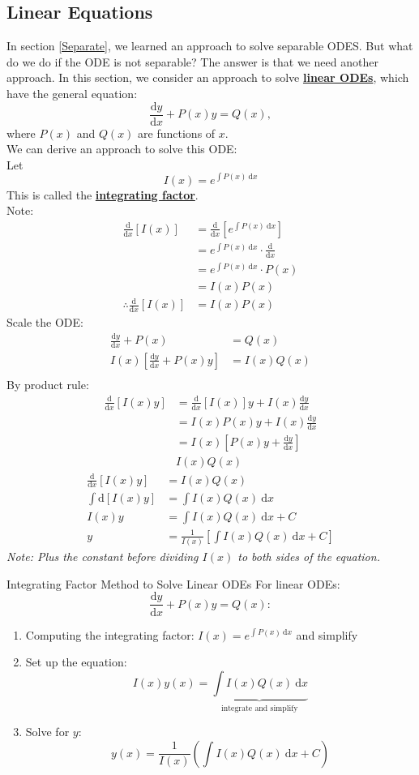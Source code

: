 \documentclass[12pt,a4paper]{article}
\def\d{{\mathrm{d}}}
\begin{document}
\subsection{Linear Equations}
In section \ref{Separate}, we learned an approach to solve separable ODES. But what do we do if the ODE is not separable? The answer is that we need another approach. In this section, we consider an approach to solve \underline{\textbf{linear ODEs}}, which have the general equation: $$\frac{\d y}{\d x}+P(x)y=Q(x),$$where $P(x)$ and $Q(x)$ are functions of $x$.\\
We can derive an approach to solve this ODE:\\
Let $$\displaystyle I(x)=e^{\int P(x)\ \d x}$$ This is called the \underline{\textbf{integrating factor}}.\\
Note: $$\begin{aligned}
	\frac{\d}{\d x}\left[I(x)\right]&=\frac{\d}{\d x}\left[e^{\int P(x)\ \d x}\right]	\\
	&=e^{\int P(x)\ \d x}\cdot\frac{\d}{\d x}\\
	&=e^{\int P(x)\ \d x}\cdot P(x)\\
	&=I(x)P(x)\\
\therefore\frac{\d}{\d x}[I(x)]&=I(x)P(x)
\end{aligned}$$
Scale the ODE: 
$$\begin{aligned}
	\frac{\d y}{\d x}+P(x)&=Q(x)\\
	\boxed{I(x)\left[\frac{\d y}{\d x}+P(x)y\right]}&=I(x)Q(x)\\
\end{aligned}$$
By product rule: 
$$\begin{aligned}
	\frac{\d}{\d x}[I(x)y]&=\frac{\d}{\d x}[I(x)]y+I(x)\frac{\d y}{\d x}\\
	&=I(x)P(x)y+I(x)\frac{\d y}{\d x}\\
	&=\boxed{I(x)\left[P(x)y+\frac{\d y}{\d x}\right]}\\
	&I(x)Q(x)
\end{aligned}$$
$$\begin{aligned}
	\frac{\d}{\d x}[I(x)y]&=I(x)Q(x)\\
	\int\d[I(x)y]&=\int I(x)Q(x)\ \d x\\
	I(x)y&=	\int I(x)Q(x)\ \d x + C\\
	y&=\frac{1}{I(x)}\left[\int I(x)Q(x)\ \d x + C\right]
\end{aligned}$$
\textit{Note: Plus the constant before dividing $I(x)$ to both sides of the equation. }
\begin{thm}{Integrating Factor Method to Solve Linear ODEs}
	For linear ODEs: 
	$$\frac{\d y}{\d x}+P(x)y=Q(x): $$
	\begin{enumerate}
		\item Computing the integrating factor: $I(x)=e^{\int P(x)\ \d x}$ and simplify
		\item Set up the equation: $$I(x)y(x)=\underbrace{\int I(x)Q(x)\ \d x}_{\text{integrate and simplify}}$$
		\item Solve for $y$: $$y(x)=\frac{1}{I(x)}\left(\int I(x)Q(x)\ \d x+C\right)$$
	\end{enumerate}
\end{thm}
\end{document}
